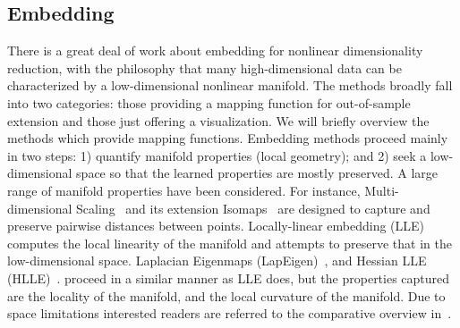 




\subsection{Embedding}
There is a great deal of work about embedding for nonlinear
dimensionality reduction, with the philosophy that many
high-dimensional data can be characterized by a low-dimensional
nonlinear manifold. The methods broadly fall into two categories:
those providing a mapping function for out-of-sample extension and 
those just offering a visualization. We will briefly overview the 
methods which provide mapping functions. Embedding methods proceed 
mainly in two steps: 1) quantify manifold properties (local geometry); 
and 2) seek a low-dimensional space so that the learned properties 
are mostly preserved. A large range of manifold properties have been
considered. For instance, Multi-dimensional
Scaling~\citep{MDScaling:08} and its extension Isomaps~\citep{isomap:00}
are designed to capture and preserve pairwise distances between
points. Locally-linear embedding (LLE)~\citep{lle:science00,
  NPEmbedding:iccv05} computes the local linearity of the
manifold and attempts to preserve that in the low-dimensional space.
Laplacian Eigenmaps (LapEigen)~\citep{eigenmaps:nips01}, and Hessian LLE
(HLLE)~\citep{hlle}. %
proceed in a similar manner as LLE does, but the
properties captured are the locality of the manifold, and the local 
curvature of the manifold.
Due to space limitations interested readers are referred to the
comparative overview in~\citep{embedding:overview:09}.

